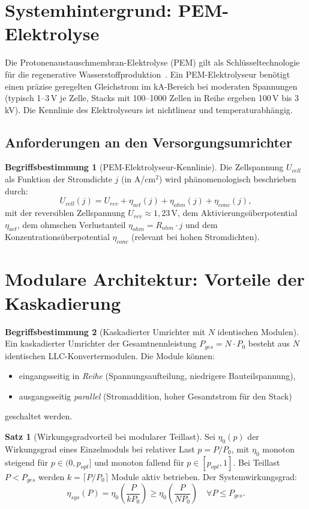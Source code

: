 ﻿\documentclass[a4paper,12pt,openany,oneside]{book}
\newcommand{\abschnitt}[1]{\section{#1}}
\newcommand{\unterabschnitt}[1]{\subsection{#1}}
\theoremstyle{definition}
\newtheorem{definition}{Begriffsbestimmung}[chapter]
\newtheorem{satz}{Satz}[chapter]
\begin{document}
\abschnitt{Systemhintergrund: PEM-Elektrolyse}

Die Protonenaustauschmembran-Elektrolyse (PEM) gilt als Schl\"usseltechnologie f\"ur die
regenerative Wasserstoffproduktion~\cite{Buttler2018}. Ein PEM-Elektrolyseur ben\"otigt
einen pr\"azise geregelten Gleichstrom im kA-Bereich bei moderaten Spannungen (typisch
1--3\,V je Zelle, Stacks mit 100--1000 Zellen in Reihe ergeben 100\,V bis 3\,kV). Die
Kennlinie des Elektrolyseurs ist nichtlinear und temperaturabh\"angig.

\unterabschnitt{Anforderungen an den Versorgungsumrichter}

\begin{definition}[PEM-Elektrolyseur-Kennlinie]
  Die Zellspannung $U_{cell}$ als Funktion der Stromdichte $j$ (in A/cm$^2$) wird
  ph\"anomenologisch beschrieben durch:
  \[
    U_{cell}(j) = U_{rev} + \eta_{act}(j) + \eta_{ohm}(j) + \eta_{conc}(j),
  \]
  mit der reversiblen Zellspannung $U_{rev} \approx 1{,}23\,\mathrm{V}$,
  dem Aktivierungs\"uberpotential $\eta_{act}$, dem ohmschen Verlustanteil $\eta_{ohm} = R_{ohm}\cdot j$
  und dem Konzentrations\"uberpotential $\eta_{conc}$ (relevant bei hohen Stromdichten).
\end{definition}

\abschnitt{Modulare Architektur: Vorteile der Kaskadierung}

\begin{definition}[Kaskadierter Umrichter mit $N$ identischen Modulen]
  Ein kaskadierter Umrichter der Gesamtnennleistung $P_{ges} = N \cdot P_0$ besteht aus
  $N$ identischen LLC-Konvertermodulen. Die Module k\"onnen:
  \begin{itemize}
    \item eingangsseitig in \emph{Reihe} (Spannungsaufteilung, niedrigere Bauteilspannung),
    \item ausgangsseitig \emph{parallel} (Stromaddition, hoher Gesamtstrom f\"ur den Stack)
  \end{itemize}
  geschaltet werden.
\end{definition}

\begin{satz}[Wirkungsgradvorteil bei modularer Teillast]
\label{satz:teillast}
  Sei $\eta_0(p)$ der Wirkungsgrad eines Einzelmoduls bei relativer Last $p = P/P_0$,
  mit $\eta_0$ monoton steigend f\"ur $p \in (0, p_{opt}]$ und monoton fallend f\"ur
  $p \in [p_{opt}, 1]$. Bei Teillast $P < P_{ges}$ werden $k = \lceil P/P_0 \rceil$ Module
  aktiv betrieben. Der Systemwirkungsgrad:
  \[
    \eta_{sys}(P) = \eta_0\!\left(\frac{P}{k P_0}\right) \geq \eta_0\!\left(\frac{P}{N P_0}\right)
    \quad \forall P \leq P_{ges}.
  \]
\end{satz}
\end{document}
